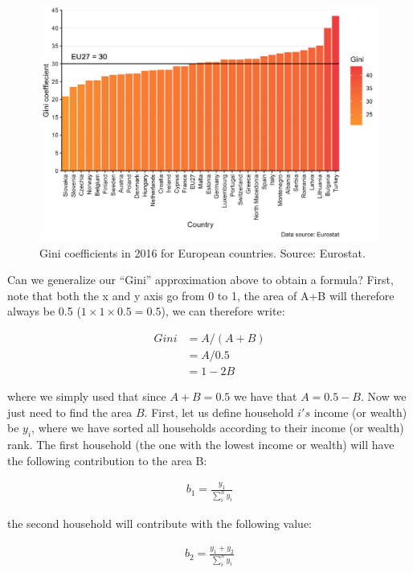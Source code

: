 \documentclass[
]{book}
\begin{document}
\begin{figure}

{\centering \includegraphics[width=0.9\linewidth]{./resources/chapter_inequality/ex7} 

}

\caption{Gini coefficients in 2016 for European countries. Source: Eurostat.}\label{fig:poverty3}
\end{figure}

Can we generalize our ``Gini'' approximation above to obtain a formula? First, note that both the x and y axis go from 0 to 1, the area of A+B will therefore always be 0.5 (\(1\times 1\times 0.5=0.5\)), we can therefore write:

\begin{align}
    Gini&=A/(A+B)\nonumber\\
    &=A/0.5\nonumber\\
    &=1-2B
\end{align}

where we simply used that since \(A+B=0.5\) we have that \(A=0.5-B\). Now we just need to find the area \(B\). First, let us define household \(i's\) income (or wealth) be \(y_i\), where we have sorted all households according to their income (or wealth) rank. The first household (the one with the lowest income or wealth) will have the following contribution to the area B:

\begin{align}
  b_1=\frac{y_1}{\sum_i^ny_i}
\end{align}

the second household will contribute with the following value:

\begin{align}
  b_2=\frac{y_1+y_2}{\sum_i^ny_i}
\end{align}
\end{document}
